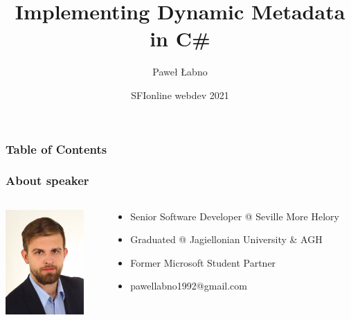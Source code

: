 \documentclass{beamer}
\title{Implementing Dynamic Metadata in C\#}
\author{Paweł Łabno}
\institute{Seville More Helory}
\date{SFIonline webdev 2021}
\begin{document}
\lstset{style=sharpc, linewidth=11cm, basicstyle=\ttfamily\footnotesize}

\frame{\titlepage}

\begin{frame}
\frametitle{Table of Contents}
\tableofcontents
\end{frame}

\begin{frame}
\frametitle{About speaker}

\begin{columns}
\begin{column}{0.3\textwidth}
 \includegraphics[width=3cm, height=4cm]{photo.jpg}
\end{column}
\begin{column}{0.7\textwidth}  %
	  \begin{itemize}
	  \item Senior Software Developer @ Seville More Helory
	  \item Graduated @ Jagiellonian University \& AGH 
	  \item Former Microsoft Student Partner
	 \item pawellabno1992@gmail.com
	\end{itemize}
\end{column}
\end{columns}


\end{frame}
\end{document}
